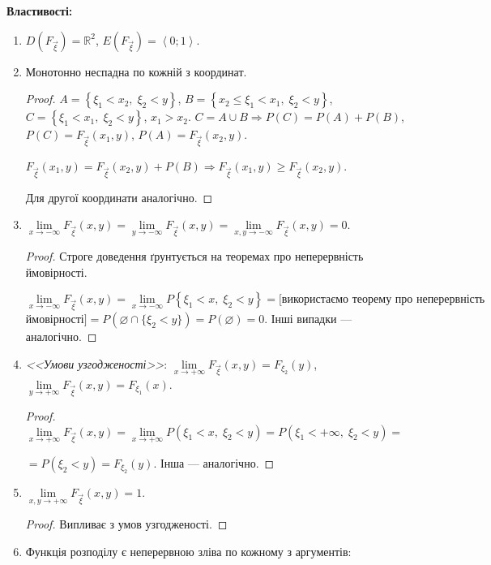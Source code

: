 \noindent\textbf{Властивості: }
\begin{enumerate}
    \item $D(F_{\vec{\xi}}) = \mathbb{R}^2$, $E(F_{\vec{\xi}}) = 
    \left<0; 1\right>$.
    \item Монотонно неспадна по кожній з координат.
    \begin{proof}
        $A = \left\{\xi_1 < x_2,\;\xi_2 < y \right\}$, 
        $B = \left\{x_2 \leq \xi_1 < x_1,\; \xi_2<y\right\}$, 
        $C = \left\{\xi_1 < x_1,\; \xi_2 < y\right\}$, $x_1 > x_2$.
        $C = A \cup B \Rightarrow P(C) = P(A) + P(B)$,
        $P(C) = F_{\vec{\xi}}(x_1, y)$,  
        $P(A) = F_{\vec{\xi}}(x_2, y)$.

        $F_{\vec{\xi}}(x_1, y) = F_{\vec{\xi}}(x_2, y) + P(B)
        \Rightarrow F_{\vec{\xi}}(x_1, y) \geq  F_{\vec{\xi}}(x_2, y)$. 
        
        Для другої координати аналогічно.
    \end{proof}
    \item $\lim\limits_{x \to -\infty} F_{\vec{\xi}}(x, y) = 
           \lim\limits_{y \to -\infty} F_{\vec{\xi}}(x, y) = 
           \lim\limits_{x,y \to -\infty} F_{\vec{\xi}}(x, y) = 0$.
    \begin{proof}
        Строге доведення ґрунтується на теоремах про неперервність 
        ймовірності.

        $\lim\limits_{x \to -\infty} F_{\vec{\xi}}(x, y) = 
        \lim\limits_{x \to -\infty} P\left\{\xi_1<x,\;\xi_2<y\right\} 
        = [\text{використаємо теорему про неперервність}$ 
        $\text{ймовірності}] = P(\varnothing \cap \{\xi_2 < y\})
        = P(\varnothing) = 0$.
        Інші випадки --- аналогічно.
    \end{proof}
    \item \emph{<<Умови узгодженості>>}:
    $\lim\limits_{x \to +\infty} F_{\vec{\xi}}(x, y) = F_{\xi_2}(y)$, 
    $\lim\limits_{y \to +\infty} F_{\vec{\xi}}(x, y) = F_{\xi_1}(x)$.
    \begin{proof}
        $\lim\limits_{x \to +\infty} F_{\vec{\xi}}(x, y) = 
        \lim\limits_{x \to +\infty} 
        P\left(\xi_1 < x,\; \xi_2 < y\right) = 
        P\left(\xi_1 < +\infty,\;\xi_2<y\right) = $
        
        $= P\left(\xi_2<y\right) = F_{\xi_2}(y)$. Інша --- аналогічно.
    \end{proof}
    \item $\lim\limits_{x,y \to +\infty} F_{\vec{\xi}}(x, y) = 1$.
    \begin{proof}
        Випливає з умов узгодженості.
    \end{proof}
    \item Функція розподілу є неперервною зліва по кожному з аргументів: 
    

\end{enumerate}
